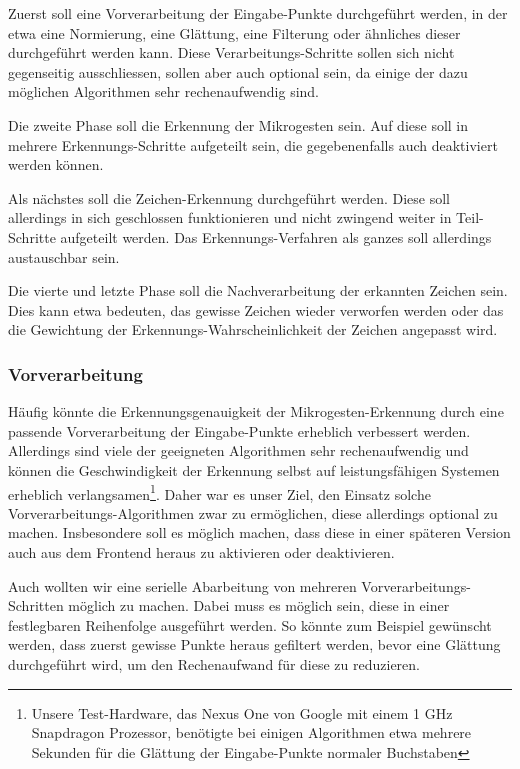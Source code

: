 Zuerst soll eine Vorverarbeitung der Eingabe-Punkte durchgeführt werden, in der etwa eine Normierung, eine Glättung, eine Filterung oder ähnliches dieser durchgeführt werden kann. Diese Verarbeitungs-Schritte sollen sich nicht gegenseitig ausschliessen, sollen aber auch optional sein, da einige der dazu möglichen Algorithmen sehr rechenaufwendig sind.

Die zweite Phase soll die Erkennung der Mikrogesten sein. Auf diese soll in mehrere Erkennungs-Schritte aufgeteilt sein, die gegebenenfalls auch deaktiviert werden können.

Als nächstes soll die Zeichen-Erkennung durchgeführt werden. Diese soll allerdings in sich geschlossen funktionieren und nicht zwingend weiter in Teil-Schritte aufgeteilt werden. Das Erkennungs-Verfahren als ganzes soll allerdings austauschbar sein.

Die vierte und letzte Phase soll die Nachverarbeitung der erkannten Zeichen sein. Dies kann etwa bedeuten, das gewisse Zeichen wieder verworfen werden oder das die Gewichtung der Erkennungs-Wahrscheinlichkeit der Zeichen angepasst wird.

\subsubsection{Vorverarbeitung}

Häufig könnte die Erkennungsgenauigkeit der Mikrogesten-Erkennung durch eine passende Vorverarbeitung der Eingabe-Punkte erheblich verbessert werden. Allerdings sind viele der geeigneten Algorithmen sehr rechenaufwendig und können die Geschwindigkeit der Erkennung selbst auf leistungsfähigen Systemen erheblich verlangsamen\footnote{Unsere Test-Hardware, das Nexus One von Google mit einem 1 GHz Snapdragon Prozessor, benötigte bei einigen Algorithmen etwa mehrere Sekunden für die Glättung der Eingabe-Punkte normaler Buchstaben}. Daher war es unser Ziel, den Einsatz solche Vorverarbeitungs-Algorithmen zwar zu ermöglichen, diese allerdings optional zu machen. Insbesondere soll es möglich machen, dass diese in einer späteren Version auch aus dem Frontend heraus zu aktivieren oder deaktivieren.

Auch wollten wir eine serielle Abarbeitung von mehreren Vorverarbeitungs-Schritten möglich zu machen. Dabei muss es möglich sein, diese in einer festlegbaren Reihenfolge ausgeführt werden. So könnte zum Beispiel gewünscht werden, dass zuerst gewisse Punkte heraus gefiltert werden, bevor eine Glättung durchgeführt wird, um den Rechenaufwand für diese zu reduzieren.


